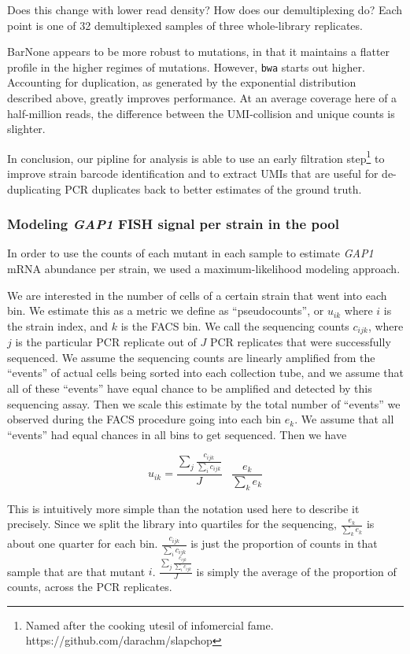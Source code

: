 {Does this change with lower read density? How does our demultiplexing
do? Each point is one of 32 demultiplexed samples of three whole-library
replicates.



BarNone appears to be more robust to mutations, in that it maintains a
flatter profile in the higher regimes of mutations. However,
\texttt{bwa} starts out higher. Accounting for duplication, as generated
by the exponential distribution described above, greatly improves
performance. At an average coverage here of a half-million reads, the
difference between the UMI-collision and unique counts is slighter.

In conclusion, our pipline for analysis is able to use an early
filtration step\footnote{Named after the cooking utesil of infomercial
  fame. https://github.com/darachm/slapchop} to improve strain barcode
identification and to extract UMIs that are useful for de-duplicating
PCR duplicates back to better estimates of the ground truth.

\subsubsection{Modeling \textit{GAP1} FISH signal per strain in the pool}

In order to use the counts of each mutant in each sample to estimate
\emph{GAP1} mRNA abundance per strain, we used a maximum-likelihood
modeling approach.

We are interested in the number of cells of a certain strain that went
into each bin. We estimate this as a metric we define as
``pseudocounts'', or \(u_{ik}\) where \(i\) is the strain index, and
\(k\) is the FACS bin. We call the sequencing counts \(c_{ijk}\), where
\(j\) is the particular PCR replicate out of \(J\) PCR replicates that
were successfully sequenced. We assume the sequencing counts are
linearly amplified from the ``events'' of actual cells being sorted into
each collection tube, and we assume that all of these ``events'' have
equal chance to be amplified and detected by this sequencing assay. Then
we scale this estimate by the total number of ``events'' we observed
during the FACS procedure going into each bin \(e_k\). We assume that
all ``events'' had equal chances in all bins to get sequenced. Then we
have

\[ u_{ik} = 
  \frac{ \sum_j \frac{c_{ijk}}{\sum_i c_{ijk}} }{J}
  \;\;\; \frac{ e_{k}}{\sum_{k} e_{k}} \]

This is intuitively more simple than the notation used here to describe
it precisely. Since we split the library into quartiles for the
sequencing, \(\frac{ e_{k}}{\sum_{k} e_{k}}\) is about one quarter for
each bin. \(\frac{ c_{ijk}}{\sum_{i} c_{ijk}}\) is just the proportion
of counts in that sample that are that mutant \(i\).
\(\frac{ \sum_j \frac{c_{ijk}}{\sum_i c_{ijk}} }{J}\) is simply the
average of the proportion of counts, across the PCR replicates.

}
